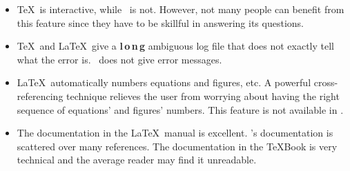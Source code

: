 \begin{itemize}
\item \TeX\ is interactive, while \troff\ is not. However, not many people can
benefit from this feature since they have to be skillful in answering
its questions.

\item \TeX\ and \LaTeX\ give a {\bf l\,o\,n\,g} ambiguous log file that does not
exactly tell what the error is. \Troff\ does not give error messages.

\item \LaTeX\ automatically numbers equations and figures, etc. A powerful
cross-referencing technique relieves the user from worrying about having
the right sequence of equations' and figures' numbers. This feature
is not available in \troff.

\item The documentation in the \LaTeX\ manual is excellent.
\Troff's documentation is scattered over many references.
The documentation in the \TeX Book is very technical and the average reader
may find it unreadable.

\end{itemize}

